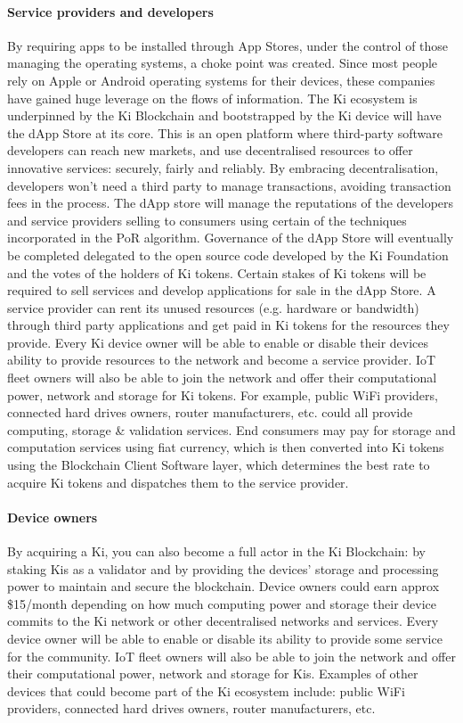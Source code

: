 \paragraph{Service providers and developers}
By requiring apps to be installed through App Stores, under the control of those managing the operating systems, a choke point was created. Since most people rely on Apple or Android operating systems for their devices, these companies have gained huge leverage on the flows of information.
The Ki ecosystem is underpinned by the Ki Blockchain and bootstrapped by the Ki device will have the dApp Store at its core. This is an open platform where third-party software developers can reach new markets, and use decentralised resources to offer innovative services: securely, fairly and reliably. By embracing decentralisation, developers won’t need a third party to manage transactions, avoiding transaction fees in the process. The dApp store will manage the reputations of the developers and service providers selling to consumers using certain of the techniques incorporated in the PoR algorithm. 
Governance of the dApp Store will eventually be completed delegated to the open source code developed by the Ki Foundation and the votes of the holders of Ki tokens. Certain stakes of Ki tokens will be required to sell services and develop applications for sale in the dApp Store. 
A service provider can rent its unused resources (e.g. hardware or bandwidth) through third party applications and get paid in Ki tokens for the resources they provide. Every Ki device owner will be able to enable or disable their devices ability to provide resources to the network and become a service provider. 
IoT fleet owners will also be able to join the network and offer their computational power, network and storage for Ki tokens. For example, public WiFi providers, connected hard drives owners, router manufacturers, etc. could all provide computing, storage \& validation services. End consumers may pay for storage and computation services using fiat currency, which is then converted into Ki tokens using the Blockchain Client Software layer, which determines the best rate to acquire Ki tokens and dispatches them to the service provider.

\paragraph{Device owners}
By acquiring a Ki, you can also become a full actor in the Ki Blockchain: by staking Kis as a validator and by providing the devices’ storage and processing power to maintain and secure the blockchain.
Device owners could earn approx \$15/month depending on how much computing power and storage their device commits to the Ki network or other decentralised networks and services. Every device owner will be able to enable or disable its ability to provide some service for the community. IoT fleet owners will also be able to join the network and offer their computational power, network and storage for Kis. Examples of other devices that could become part of the Ki ecosystem include: public WiFi providers, connected hard drives owners, router manufacturers, etc.

